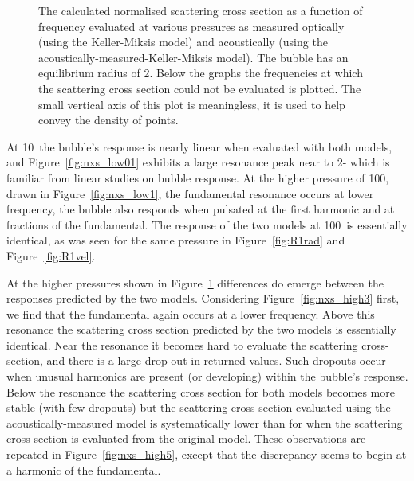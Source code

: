 \documentclass[10pt, fleqn,draft,showtrims,oldfontcommands]{article} %
\newcommand{\figref}[1]{Figure~\ref{fig:#1}}
\begin{document}
 \begin{figure}[p!]
      \centering
 \end{figure}
\begin{figure}[p!]
      \centering
      \caption{The calculated normalised scattering cross section as a function of frequency evaluated at various pressures as measured optically (using the Keller-Miksis model) and acoustically (using the acoustically-measured-Keller-Miksis model). The bubble has an equilibrium radius of \unit{2}\micro\metre. 
Below the graphs the frequencies at which the scattering cross section could not be evaluated is plotted.
The small vertical axis of this plot is meaningless, it is used to help convey the density of points.
}
      \label{fig:nxs_high}
 \end{figure}



At \unit{10}\kilo\pascal\ the  bubble's response is nearly linear when evaluated with both models,
and \figref{nxs_low01} exhibits a large resonance peak near to \unit{2}\mega\hertz  -
which is familiar from linear studies on bubble response\cite{Hoff2001}.
At the higher pressure of  \unit{100}\kilo\pascal, drawn in \figref{nxs_low1}, the fundamental resonance occurs at lower frequency, the bubble also responds when pulsated at the first harmonic and at fractions of the fundamental. 
The response of the two models at  \unit{100}\kilo\pascal\ is essentially identical, 
as was seen for the same pressure in  \figref{R1rad} and \figref{R1vel}.

At the higher pressures shown in \figref{nxs_high} differences do emerge between the responses predicted by the two models.
Considering  \figref{nxs_high3} first, 
we find that the fundamental again occurs at a lower frequency.
Above this resonance the scattering cross section predicted by the two models is essentially identical.
Near the resonance it becomes  hard to evaluate the scattering cross-section, and there is a large drop-out in returned values.
Such dropouts occur when unusual harmonics are present (or developing) within the bubble's response.
Below the resonance the scattering cross section for both models becomes more stable (with few dropouts)
but the scattering cross section evaluated using the acoustically-measured model is systematically 
lower than for when the scattering cross section is evaluated from the original model.
These observations are repeated in \figref{nxs_high5}, except that the discrepancy seems to begin at a harmonic of the fundamental.
\end{document}
